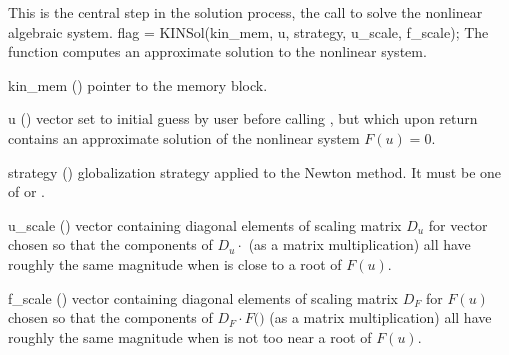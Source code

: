 This is the central step in the solution process, the call to solve
the nonlinear algebraic system.
%
{
  flag = KINSol(kin\_mem, u, strategy, u\_scale, f\_scale);
}
{
  The function  computes an approximate solution to the nonlinear
  system.
}
{
  \begin{args}[strategy]
  \item[kin\_mem] ()
    pointer to the {\kinsol} memory block.
  \item[u] ()
    vector set to initial guess by user before calling ,
    but which upon return contains an approximate solution of
    the nonlinear system $F(u) = 0$.
  \item[strategy] ()
    globalization strategy applied to the Newton method.
    It must be one of  or .
  \item[u\_scale] ()
    vector containing diagonal elements of scaling matrix $D_u$ for vector 
    chosen so that the components of $D_u \cdot$
    (as a matrix multiplication) all have roughly the same magnitude when 
     is close to a root of $F(u)$.
  \item[f\_scale] ()
    vector containing diagonal elements of scaling matrix $D_F$ for $F(u)$ chosen 
    so that the components of $D_F \cdot F($$)$ 
    (as a matrix multiplication) all have roughly the same magnitude when 
     is not too near a root of $F(u)$.
  \end{args}
}

